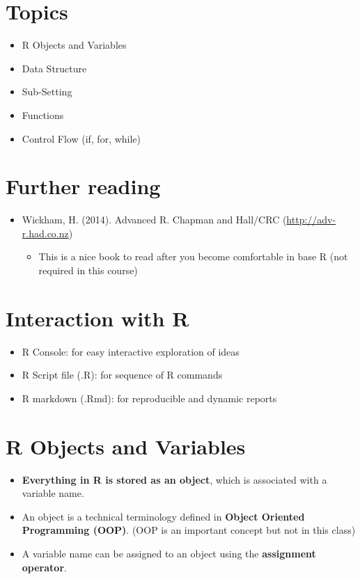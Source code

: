 \documentclass[]{book}
\providecommand{\tightlist}{%
  \setlength{\itemsep}{0pt}\setlength{\parskip}{0pt}}
\begin{document}
\section{Topics}\label{topics}

\begin{itemize}
\tightlist
\item
  R Objects and Variables
\item
  Data Structure
\item
  Sub-Setting
\item
  Functions
\item
  Control Flow (if, for, while)
\end{itemize}

\section{Further reading}\label{further-reading}

\begin{itemize}
\tightlist
\item
  Wickham, H. (2014). Advanced R. Chapman and Hall/CRC
  (\url{http://adv-r.had.co.nz})

  \begin{itemize}
  \tightlist
  \item
    This is a nice book to read after you become comfortable in base R
    (not required in this course)
  \end{itemize}
\end{itemize}

\section{Interaction with R}\label{interaction-with-r}

\begin{itemize}
\tightlist
\item
  R Console: for easy interactive exploration of ideas
\item
  R Script file (.R): for sequence of R commands
\item
  R markdown (.Rmd): for reproducible and dynamic reports
\end{itemize}

\section{R Objects and Variables}\label{r-objects-and-variables}

\begin{itemize}
\tightlist
\item
  \textbf{Everything in R is stored as an object}, which is associated
  with a variable name.
\item
  An object is a technical terminology defined in \textbf{Object
  Oriented Programming (OOP)}. (OOP is an important concept but not in
  this class)
\item
  A variable name can be assigned to an object using the
  \textbf{assignment operator}.
\end{itemize}
\end{document}
